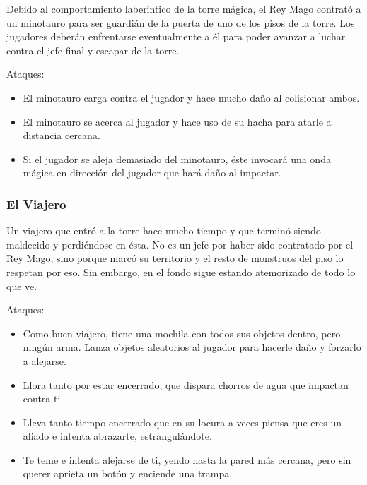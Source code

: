 Debido al comportamiento laberíntico de la torre mágica, el Rey Mago contrató a
un minotauro para ser guardián de la puerta de uno de los pisos de la torre. Los
jugadores deberán enfrentarse eventualmente a él para poder avanzar a luchar
contra el jefe final y escapar de la torre.

Ataques:
\begin{itemize}
    \item El minotauro carga contra el jugador y hace mucho daño al colisionar ambos.
    \item El minotauro se acerca al jugador y hace uso de su hacha para atarle a
    distancia cercana.
    \item Si el jugador se aleja demasiado del minotauro, éste invocará una onda
    mágica en dirección del jugador que hará daño al impactar.
\end{itemize}


\subsubsection{El Viajero}

Un viajero que entró a la torre hace mucho tiempo y que terminó siendo maldecido
y perdiéndose en ésta. No es un jefe por haber sido contratado por el Rey Mago,
sino porque marcó su territorio y el resto de monstruos del piso lo respetan por
eso. Sin embargo, en el fondo sigue estando atemorizado de todo lo que ve.

Ataques:
\begin{itemize}
    \item Como buen viajero, tiene una mochila con todos sus objetos dentro,
    pero ningún arma. Lanza objetos aleatorios al jugador para hacerle daño y forzarlo a
    alejarse.
    \item Llora tanto por estar encerrado, que dispara chorros de agua que
    impactan contra ti.
    \item Lleva tanto tiempo encerrado que en su locura a veces piensa que eres
    un aliado e intenta abrazarte, estrangulándote.
    \item Te teme e intenta alejarse de ti, yendo hasta la pared más cercana,
    pero sin querer aprieta un botón y enciende una trampa.
\end{itemize}


